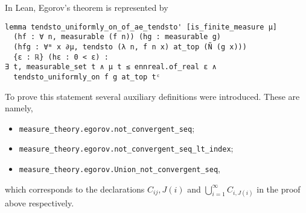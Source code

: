 \documentclass[]{article}
\theoremstyle{definition}
\begin{document}
In Lean, Egorov's theorem is represented by 
\begin{verbatim}
lemma tendsto_uniformly_on_of_ae_tendsto' [is_finite_measure μ]
  (hf : ∀ n, measurable (f n)) (hg : measurable g)
  (hfg : ∀ᵐ x ∂μ, tendsto (λ n, f n x) at_top (Ñ (g x)))
  {ε : ℝ} (hε : 0 < ε) :
∃ t, measurable_set t ∧ μ t ≤ ennreal.of_real ε ∧
  tendsto_uniformly_on f g at_top tᶜ
\end{verbatim}

To prove this statement several auxiliary definitions were introduced. These are 
namely,
\begin{itemize}
  \item \texttt{measure_theory.egorov.not_convergent_seq};
  \item \texttt{measure_theory.egorov.not_convergent_seq_lt_index};
  \item \texttt{measure_theory.egorov.Union_not_convergent_seq},
\end{itemize}
which corresponds to the declarations \(C_{ij}, J(i)\) and \(\bigcup_{i = 1}^\infty C_{i, J(i)}\) 
in the proof above respectively.
\end{document}
